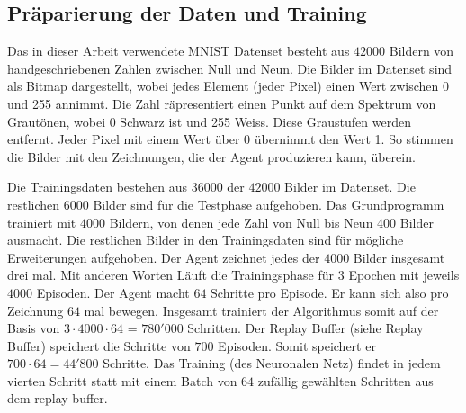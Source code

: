 \subsection*{Präparierung der Daten und Training}
Das in dieser Arbeit verwendete MNIST Datenset besteht aus $42000$ Bildern von
handgeschriebenen Zahlen zwischen Null und Neun. Die Bilder im Datenset sind als
Bitmap dargestellt, wobei jedes Element (jeder Pixel) einen Wert zwischen $0$ und
255 annimmt. Die Zahl räpresentiert einen Punkt auf dem Spektrum von Grautönen,
wobei 0 Schwarz ist und 255 Weiss. Diese Graustufen werden entfernt. Jeder Pixel
mit einem Wert über 0 übernimmt den Wert 1. So stimmen die Bilder mit den
Zeichnungen, die der Agent produzieren kann, überein.

Die Trainingsdaten bestehen aus $36000$ der $42000$ Bilder im Datenset. Die
restlichen $6000$ Bilder sind für die Testphase aufgehoben. Das Grundprogramm
trainiert mit $4000$ Bildern, von denen jede Zahl von Null bis Neun $400$ Bilder
ausmacht. Die restlichen Bilder in den Trainingsdaten sind für mögliche
Erweiterungen aufgehoben. Der Agent zeichnet jedes der $4000$ Bilder insgesamt
drei mal. Mit anderen Worten Läuft die Trainingsphase für $3$ Epochen mit
jeweils $4000$ Episoden. Der Agent macht $64$ Schritte pro Episode. Er kann sich
also pro Zeichnung $64$ mal bewegen. Insgesamt trainiert der Algorithmus somit
auf der Basis von $3\cdot4000\cdot64$ = $780'000$ Schritten. Der Replay Buffer
(siehe Replay Buffer) speichert die Schritte von $700$ Episoden. Somit speichert  %
er $700\cdot64 = 44'800$ Schritte. Das Training (des Neuronalen Netz) findet in
jedem vierten Schritt statt mit einem Batch von $64$ zufällig gewählten
Schritten aus dem replay buffer.











    


